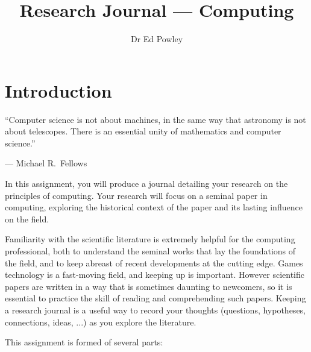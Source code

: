 \documentclass{../../fal_assignment}
\title{Research Journal --- Computing}
\author{Dr Ed Powley}
\begin{document}
\maketitle

\section*{Introduction}

\begin{marginquote}
  ``Computer science is not about machines, in the same way that astronomy is not about telescopes. There is an essential unity of mathematics and computer science.''
    
    --- Michael R.\ Fellows
\end{marginquote}

In this assignment, you will produce a journal detailing your research on the principles of computing.
Your research will focus on a seminal paper in computing,
exploring the historical context of the paper and its lasting influence on the field.

Familiarity with the scientific literature is extremely helpful for the computing professional,
both to understand the seminal works that lay the foundations of the field,
and to keep abreast of recent developments at the cutting edge.
Games technology is a fast-moving field, and keeping up is important.
However scientific papers are written in a way that is sometimes daunting to newcomers,
so it is essential to practice the skill of reading and comprehending such papers.
Keeping a research journal is a useful way to record your thoughts
(questions, hypotheses, connections, ideas, ...) as you explore the literature.

This assignment is formed of several parts:
\end{document}

